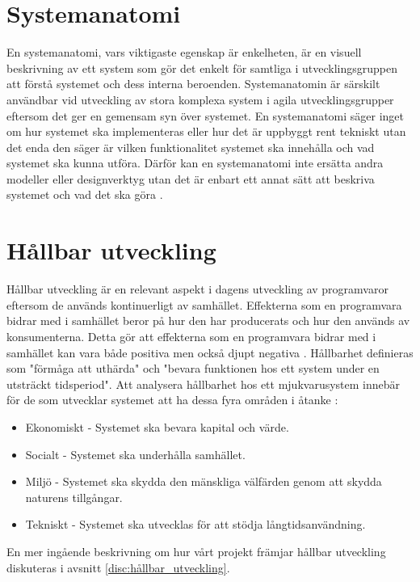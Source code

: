 \section{Systemanatomi}
En systemanatomi, vars viktigaste egenskap är enkelheten, är en visuell beskrivning av ett system som gör det enkelt för samtliga i utvecklingsgruppen att förstå systemet och dess interna beroenden. Systemanatomin är särskilt användbar vid utveckling av stora komplexa system i agila utvecklingsgrupper eftersom det ger en gemensam syn över systemet. En systemanatomi säger inget om hur systemet ska implementeras eller hur det är uppbyggt rent tekniskt utan det enda den säger är vilken funktionalitet systemet ska innehålla och vad systemet ska kunna utföra. Därför kan en systemanatomi inte ersätta andra modeller eller designverktyg utan det är enbart ett annat sätt att beskriva systemet och vad det ska göra \cite{system_anatomy}.


\section{Hållbar utveckling}
Hållbar utveckling är en relevant aspekt i dagens utveckling av programvaror eftersom de används kontinuerligt av samhället. Effekterna som en programvara bidrar med i samhället beror på hur den har producerats och hur den används av konsumenterna. Detta gör att effekterna som en programvara bidrar med i samhället kan vara både positiva men också djupt negativa \cite{raturi2014developing}. Hållbarhet definieras som "förmåga att uthärda" och "bevara funktionen hos ett system under en utsträckt tidsperiod". Att analysera hållbarhet hos ett mjukvarusystem innebär för de som utvecklar systemet att ha dessa fyra områden i åtanke \cite{lago2015framing}:

\begin{itemize}
	\item Ekonomiskt -  Systemet ska bevara kapital och värde.
	\item Socialt - Systemet ska underhålla samhället.
	\item Miljö - Systemet ska skydda den mänskliga välfärden genom att skydda naturens tillgångar.
	\item Tekniskt - Systemet ska utvecklas för att stödja långtidsanvändning.
\end{itemize}
En mer ingående beskrivning om hur vårt projekt främjar hållbar utveckling diskuteras i avsnitt \ref{disc:hållbar_utveckling}.


